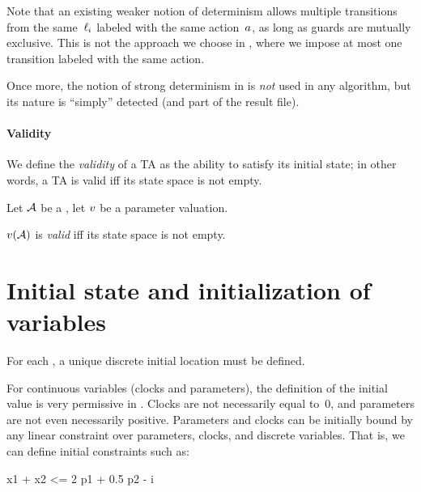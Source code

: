 Note that an existing weaker notion of determinism allows multiple transitions from the same~$\ell_i$ labeled with the same action~$a$, as long as guards are mutually exclusive.
This is not the approach we choose in \imitator{}, where we impose at most one transition labeled with the same action.

Once more, the notion of strong determinism in \imitator{} is \emph{not} used in any algorithm, but its nature is ``simply'' detected (and part of the result file).


\paragraph{Validity}
We define the \emph{validity} of a TA as the ability to satisfy its initial state; in other words, a TA is valid iff its state space is not empty.


\begin{definition}[validity]\label{definition:validity}
	Let $\mathcal{A}$ be a \NIPTA{}, let $v$ be a parameter valuation.

	$v(\mathcal{A})$ is \emph{valid} iff its state space is not empty.
\end{definition}



\section{Initial state and initialization of variables}\label{section:init}

For each \IPTA{}, a unique discrete initial location must be defined.

For continuous variables (clocks and parameters), the definition of the initial value is very permissive in \imitator{}.
Clocks are not necessarily equal to~0, and parameters are not even necessarily positive.
%
Parameters and clocks can be initially bound by any linear constraint over parameters, clocks, and discrete variables.
That is, we can define initial constraints such as:

\begin{IMITATORmodel}
x1 + x2 <= 2 p1 + 0.5 p2 - i
\end{IMITATORmodel}

